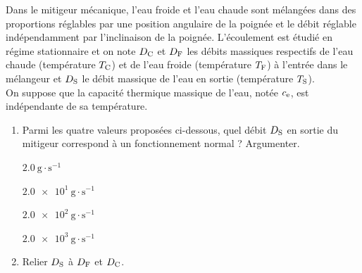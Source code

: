 \documentclass[a4paper,french,bookmarks]{article}
\begin{document}
Dans le mitigeur mécanique, l'eau froide et l'eau chaude sont mélangées dans des proportions réglables par une position angulaire de la poignée et le débit réglable indépendamment par l'inclinaison de la poignée. L'écoulement est étudié en régime stationnaire et on note $D_\text C$ et $D_\text F$ les débits massiques respectifs de l'eau chaude (température $T_\text C$) et de l'eau froide (température $T_\text F$) à l'entrée dans le mélangeur et $D_\text S$ le débit massique de l'eau en sortie (température $T_\text S$).\\[2pt]
%
On suppose que la capacité thermique massique de l'eau, notée $c_\text e$, est indépendante de sa température.

\begin{enumerate}
    \item Parmi les quatre valeurs proposées ci-dessous, quel débit $D_\text S$ en sortie du mitigeur correspond à un fonctionnement normal ? Argumenter.
    
    \begin{enumerate}
        \begin{minipage}{0.25\textwidth}
            \itt $\SI{2.0}{\g \cdot \second^{-1}}$
        \end{minipage}
        \begin{minipage}{0.25\textwidth}
            \itt $\SI{2.0e1}{\g \cdot \second^{-1}}$
        \end{minipage}
        \begin{minipage}{0.25\textwidth}
            \itt $\SI{2.0e2}{\g \cdot \second^{-1}}$
        \end{minipage}
        \begin{minipage}{0.25\textwidth}
            \itt $\SI{2.0e3}{\g \cdot \second^{-1}}$
        \end{minipage}
    \end{enumerate}
    
    
    \item Relier $D_\text S$ à $D_\text F$ et $D_\text C$.
    
    

\end{enumerate}
\end{document}
